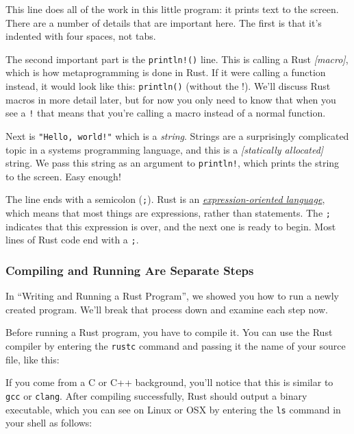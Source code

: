 \documentclass[a4paper,]{book}
\newenvironment{Shaded}{\begin{snugshade}}{\end{snugshade}}
\newcommand{\KeywordTok}[1]{\textcolor[rgb]{0.13,0.29,0.53}{\textbf{{#1}}}}
\newcommand{\NormalTok}[1]{{#1}}
\begin{document}
This line does all of the work in this little program: it prints text to
the screen. There are a number of details that are important here. The
first is that it's indented with four spaces, not tabs.

The second important part is the \texttt{println!()} line. This is
calling a Rust \emph{{[}macro{]}}, which is how metaprogramming is done
in Rust. If it were calling a function instead, it would look like this:
\texttt{println()} (without the !). We'll discuss Rust macros in more
detail later, but for now you only need to know that when you see a
\texttt{!} that means that you're calling a macro instead of a normal
function.

Next is \texttt{"Hello,\ world!"} which is a \emph{string}. Strings are
a surprisingly complicated topic in a systems programming language, and
this is a \emph{{[}statically allocated{]}} string. We pass this string
as an argument to \texttt{println!}, which prints the string to the
screen. Easy enough!

The line ends with a semicolon (\texttt{;}). Rust is an
\emph{\protect\hyperlink{expression-oriented-language}{expression-oriented
language}}, which means that most things are expressions, rather than
statements. The \texttt{;} indicates that this expression is over, and
the next one is ready to begin. Most lines of Rust code end with a
\texttt{;}.

\subsubsection{Compiling and Running Are Separate
Steps}\label{compiling-and-running-are-separate-steps}

In ``Writing and Running a Rust Program'', we showed you how to run a
newly created program. We'll break that process down and examine each
step now.

Before running a Rust program, you have to compile it. You can use the
Rust compiler by entering the \texttt{rustc} command and passing it the
name of your source file, like this:

\begin{Shaded}
\end{Shaded}

If you come from a C or C++ background, you'll notice that this is
similar to \texttt{gcc} or \texttt{clang}. After compiling successfully,
Rust should output a binary executable, which you can see on Linux or
OSX by entering the \texttt{ls} command in your shell as follows:
\end{document}
